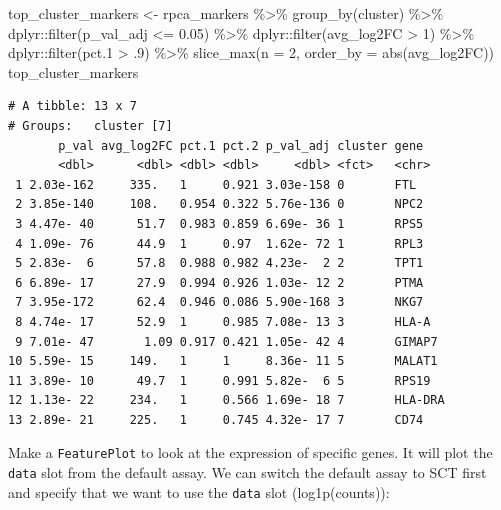 \documentclass[
  letterpaper,
  DIV=11,
  numbers=noendperiod]{scrreprt}
\newenvironment{Shaded}{\begin{snugshade}}{\end{snugshade}}
\newcommand{\AttributeTok}[1]{\textcolor[rgb]{0.40,0.45,0.13}{#1}}
\newcommand{\DecValTok}[1]{\textcolor[rgb]{0.68,0.00,0.00}{#1}}
\newcommand{\FloatTok}[1]{\textcolor[rgb]{0.68,0.00,0.00}{#1}}
\newcommand{\FunctionTok}[1]{\textcolor[rgb]{0.28,0.35,0.67}{#1}}
\newcommand{\NormalTok}[1]{\textcolor[rgb]{0.00,0.23,0.31}{#1}}
\newcommand{\OtherTok}[1]{\textcolor[rgb]{0.00,0.23,0.31}{#1}}
\newcommand{\SpecialCharTok}[1]{\textcolor[rgb]{0.37,0.37,0.37}{#1}}
\begin{document}
\begin{Shaded}
\begin{Highlighting}[]
\NormalTok{top\_cluster\_markers }\OtherTok{\textless{}{-}} 
\NormalTok{  rpca\_markers }\SpecialCharTok{\%\textgreater{}\%} 
  \FunctionTok{group\_by}\NormalTok{(cluster) }\SpecialCharTok{\%\textgreater{}\%}
\NormalTok{  dplyr}\SpecialCharTok{::}\FunctionTok{filter}\NormalTok{(p\_val\_adj }\SpecialCharTok{\textless{}=} \FloatTok{0.05}\NormalTok{) }\SpecialCharTok{\%\textgreater{}\%}
\NormalTok{  dplyr}\SpecialCharTok{::}\FunctionTok{filter}\NormalTok{(avg\_log2FC }\SpecialCharTok{\textgreater{}} \DecValTok{1}\NormalTok{) }\SpecialCharTok{\%\textgreater{}\%} 
\NormalTok{  dplyr}\SpecialCharTok{::}\FunctionTok{filter}\NormalTok{(pct}\FloatTok{.1} \SpecialCharTok{\textgreater{}}\NormalTok{ .}\DecValTok{9}\NormalTok{) }\SpecialCharTok{\%\textgreater{}\%}
  \FunctionTok{slice\_max}\NormalTok{(}\AttributeTok{n =} \DecValTok{2}\NormalTok{, }\AttributeTok{order\_by =} \FunctionTok{abs}\NormalTok{(avg\_log2FC))}
\NormalTok{top\_cluster\_markers}
\end{Highlighting}
\end{Shaded}

\begin{verbatim}
# A tibble: 13 x 7
# Groups:   cluster [7]
       p_val avg_log2FC pct.1 pct.2 p_val_adj cluster gene   
       <dbl>      <dbl> <dbl> <dbl>     <dbl> <fct>   <chr>  
 1 2.03e-162     335.   1     0.921 3.03e-158 0       FTL    
 2 3.85e-140     108.   0.954 0.322 5.76e-136 0       NPC2   
 3 4.47e- 40      51.7  0.983 0.859 6.69e- 36 1       RPS5   
 4 1.09e- 76      44.9  1     0.97  1.62e- 72 1       RPL3   
 5 2.83e-  6      57.8  0.988 0.982 4.23e-  2 2       TPT1   
 6 6.89e- 17      27.9  0.994 0.926 1.03e- 12 2       PTMA   
 7 3.95e-172      62.4  0.946 0.086 5.90e-168 3       NKG7   
 8 4.74e- 17      52.9  1     0.985 7.08e- 13 3       HLA-A  
 9 7.01e- 47       1.09 0.917 0.421 1.05e- 42 4       GIMAP7 
10 5.59e- 15     149.   1     1     8.36e- 11 5       MALAT1 
11 3.89e- 10      49.7  1     0.991 5.82e-  6 5       RPS19  
12 1.13e- 22     234.   1     0.566 1.69e- 18 7       HLA-DRA
13 2.89e- 21     225.   1     0.745 4.32e- 17 7       CD74   
\end{verbatim}

Make a \texttt{FeaturePlot} to look at the expression of specific genes.
It will plot the \texttt{data} slot from the default assay. We can
switch the default assay to SCT first and specify that we want to use
the \texttt{data} slot (log1p(counts)):
\end{document}
